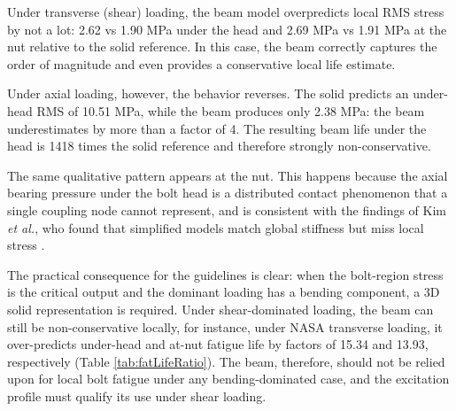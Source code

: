 \documentclass[a4paper,twoside]{bth}
\begin{document}
Under transverse (shear) loading, the beam model overpredicts local \ac{RMS} stress by not a lot: 2.62 vs 1.90 MPa under the head and 2.69 MPa vs 1.91 MPa at the nut relative to the solid reference. In this case, the beam correctly captures the order of magnitude and even provides a conservative local life estimate.

Under axial loading, however, the behavior reverses. The solid predicts an under-head \ac{RMS} of 10.51 MPa, while the beam produces only 2.38 MPa: the beam underestimates by more than a factor of 4. The resulting beam life under the head is 1418 times the solid reference and therefore strongly non-conservative.

The same qualitative pattern appears at the nut. This happens because the axial bearing pressure under the bolt head is a distributed contact phenomenon that a single coupling node cannot represent, and is consistent with the findings of Kim \textit{et al.}, who found that simplified models match global stiffness but miss local stress \cite{27}.

The practical consequence for the guidelines is clear: when the bolt-region stress is the critical output and the dominant loading has a bending component, a 3D solid representation is required. Under shear-dominated loading, the beam can still be non-conservative locally, for instance, under NASA transverse loading, it over-predicts under-head and at-nut fatigue life by factors of 15.34 and 13.93, respectively (Table \ref{tab:fatLifeRatio}). The beam, therefore, should not be relied upon for local bolt fatigue under any bending-dominated case, and the excitation profile must qualify its use under shear loading.
\end{document}

